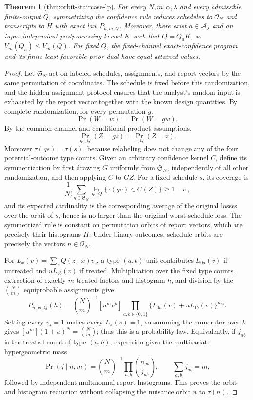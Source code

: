 \documentclass{article}
\newtheorem{theorem}{Theorem}
\begin{document}
\begin{theorem}[thm:orbit-staircase-lp]\label{thm:orbit-staircase-lp}
For every \(N,m,\alpha,\lambda\) and every admissible finite-output \(Q\), symmetrizing the confidence rule reduces schedules to \(\mathcal O_N\) and transcripts to \(H\) with exact law \(P_{n,m,Q}\). Moreover, there exist \(a\in\mathcal A_\lambda\) and an input-independent postprocessing kernel \(K\) such that \(Q=Q_aK\), so \(V_m(Q_a)\le V_m(Q)\). For fixed \(Q\), the fixed-channel exact-confidence program and its finite least-favorable-prior dual have equal attained values.
\end{theorem}
\begin{proof}
Let \(\mathfrak S_N\) act on labeled schedules, assignments, and report vectors by the same permutation of coordinates.  The schedule is fixed before this randomization, and the hidden-assignment protocol ensures that the analyst's random input is exhausted by the report vector together with the known design quantities.  By complete randomization, for every permutation \(g\),
\[
 \Pr(W=w)=\Pr(W=gw).
\]
By the common-channel and conditional-product assumptions,
\[
 \Pr_{gs,Q}(Z=gz)=\Pr_{s,Q}(Z=z).
\]
Moreover \(\tau(gs)=\tau(s)\), because relabeling does not change any of the four potential-outcome type counts.  Given an arbitrary confidence kernel \(C\), define its symmetrization by first drawing \(G\) uniformly from \(\mathfrak S_N\), independently of all other randomization, and then applying \(C\) to \(GZ\).  For a fixed schedule \(s\), its coverage is
\[
 \frac1{N!}\sum_{g\in\mathfrak S_N}
 \Pr_{gs,Q}\{\tau(gs)\in C(Z)\}\ge 1-\alpha,
\]
and its expected cardinality is the corresponding average of the original losses over the orbit of \(s\), hence is no larger than the original worst-schedule loss.  The symmetrized rule is constant on permutation orbits of report vectors, which are precisely their histograms \(H\).  Under binary outcomes, schedule orbits are precisely the vectors \(n\in\mathcal O_N\).

For \(L_x(v)=\sum_zQ(z\mid x)v_z\), a type-\((a,b)\) unit contributes \(L_{0a}(v)\) if untreated and \(uL_{1b}(v)\) if treated.  Multiplication over the fixed type counts, extraction of exactly \(m\) treated factors and histogram \(h\), and division by the \(\binom Nm\) equiprobable assignments give
\[
 P_{n,m,Q}(h)=\binom Nm^{-1}[u^mv^h]
 \prod_{a,b\in\{0,1\}}\{L_{0a}(v)+uL_{1b}(v)\}^{n_{ab}}.
\]
Setting every \(v_z=1\) makes every \(L_x(v)=1\), so summing the numerator over \(h\) gives \([u^m](1+u)^N=\binom Nm\); thus this is a probability law.  Equivalently, if \(j_{ab}\) is the treated count of type \((a,b)\), expansion gives the multivariate hypergeometric mass
\[
 \Pr(j\mid n,m)=\binom Nm^{-1}\prod_{a,b}\binom{n_{ab}}{j_{ab}},
 \qquad \sum_{a,b}j_{ab}=m,
\]
followed by independent multinomial report histograms.  This proves the orbit and histogram reduction without collapsing the nuisance orbit \(n\) to \(\tau(n)\).


\end{proof}
\end{document}
